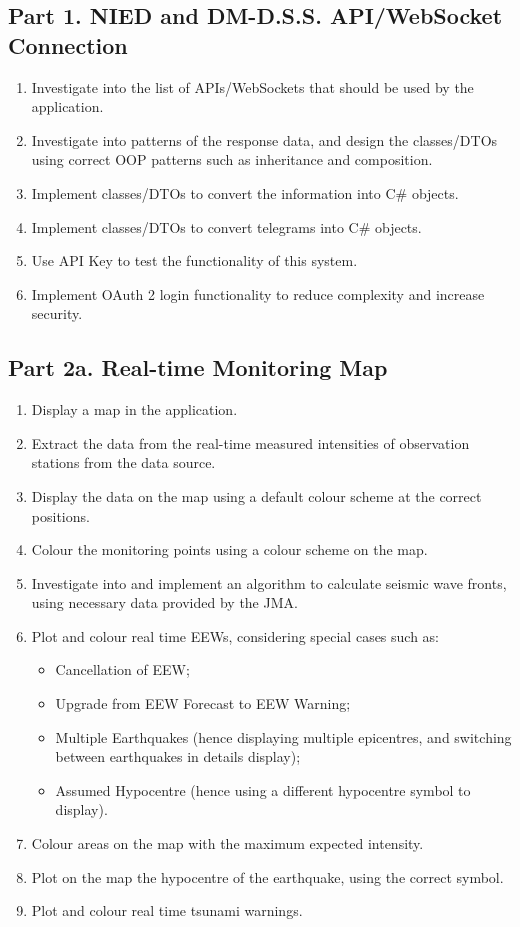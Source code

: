 \subsection{Part 1. NIED and DM-D.S.S. API/WebSocket Connection}
\begin{enumerate}
    \item Investigate into the list of APIs/WebSockets that should be used by the application.
    \item Investigate into patterns of the response data, and design the classes/DTOs using correct OOP patterns such as inheritance and composition.
    \item Implement classes/DTOs to convert the information into C\# objects.
    \item Implement classes/DTOs to convert telegrams into C\# objects.
    \item Use API Key to test the functionality of this system.
    \item Implement OAuth 2 login functionality to reduce complexity and increase security.
\end{enumerate}

\subsection{Part 2a. Real-time Monitoring Map}
\begin{enumerate}
    \item Display a map in the application.
    \item Extract the data from the real-time measured intensities of observation stations from the data source.
    \item Display the data on the map using a default colour scheme at the correct positions.
    \item Colour the monitoring points using a colour scheme on the map.
    \item Investigate into and implement an algorithm to calculate seismic wave fronts, using necessary data provided by the JMA.
    \item Plot and colour real time EEWs, considering special cases such as:
          \begin{itemize}
              \item Cancellation of EEW;
              \item Upgrade from EEW Forecast to EEW Warning;
              \item Multiple Earthquakes (hence displaying multiple epicentres, and switching between earthquakes in details display);
              \item Assumed Hypocentre (hence using a different hypocentre symbol to display).
          \end{itemize}
    \item Colour areas on the map with the maximum expected intensity.
    \item Plot on the map the hypocentre of the earthquake, using the correct symbol.
    \item Plot and colour real time tsunami warnings.
\end{enumerate}

